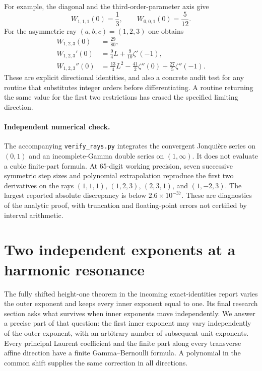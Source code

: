 \documentclass[11pt,a4paper]{article}
\theoremstyle{definition}
\theoremstyle{remark}
\numberwithin{equation}{section}
\begin{document}
For example, the diagonal and the third-order-parameter axis give
\[
 W_{1,1,1}(0)=\frac13,\qquad W_{0,0,1}(0)=\frac5{12}.
\]
For the asymmetric ray $(a,b,c)=(1,2,3)$ one obtains
\begin{align*}
 W_{1,2,3}(0)&=\frac{29}{80},\\
 W_{1,2,3}'(0)&=\frac94L+\frac9{10}\zeta'(-1),\\
 W_{1,2,3}''(0)&=\frac{13}{4}L^2-\frac{41}{2}\zeta''(0)
                             +\frac{27}{5}\zeta''(-1).
\end{align*}
These are explicit directional identities, and also a concrete audit
test for any routine that substitutes integer orders before
differentiating.  A routine returning the same value for the first
two restrictions has erased the specified limiting direction.

\paragraph{Independent numerical check.}
The accompanying \texttt{verify\_rays.py} integrates the convergent
Jonqui\`ere series on $(0,1)$ and an incomplete-Gamma double series on
$(1,\infty)$.  It does not evaluate a cubic finite-part formula.
At 65-digit working precision, seven successive symmetric step sizes
and polynomial extrapolation reproduce the first two derivatives on
the rays $(1,1,1)$, $(1,2,3)$, $(2,3,1)$, and $(1,-2,3)$.
The largest reported absolute discrepancy is below $2.6\times10^{-37}$.
These are diagnostics of the analytic proof, with truncation and
floating-point errors not certified by interval arithmetic.


\section{Two independent exponents at a harmonic resonance}
\label{h2:sec:main}

The fully shifted height-one theorem in the incoming exact-identities
report varies the outer exponent and keeps every inner exponent equal
to one. Its final research section asks what survives when inner
exponents move independently. We answer a precise part of that question:
the first inner exponent may vary independently of the outer exponent,
with an arbitrary number of subsequent unit exponents. Every principal
Laurent coefficient and the finite part along every transverse affine
direction have a finite Gamma--Bernoulli formula. A polynomial in the
common shift supplies the same correction in all directions.
\end{document}
